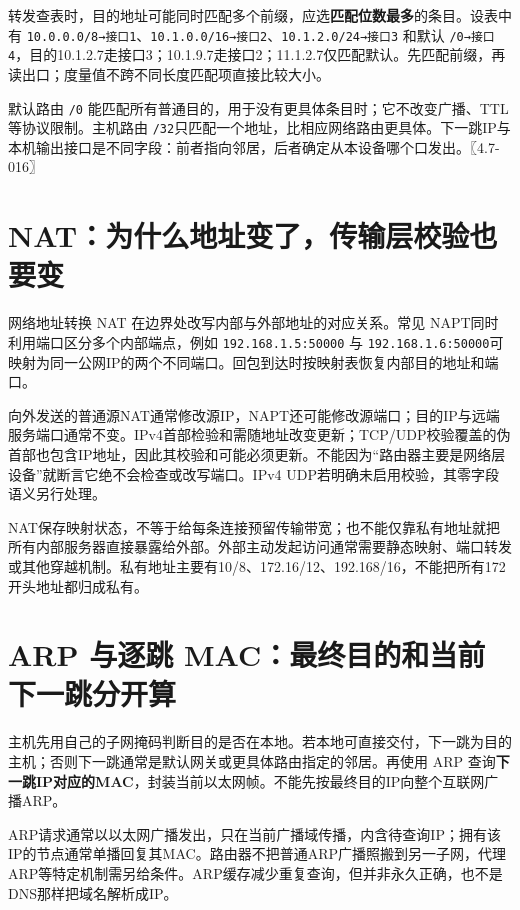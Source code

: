 转发查表时，目的地址可能同时匹配多个前缀，应选\textbf{匹配位数最多}的条目。设表中有 \allowbreak{}\texttt{10.0.0.0/8→接口1}、\allowbreak{}\texttt{10.1.0.0/16→接口2}、\allowbreak{}\texttt{10.1.2.0/24→接口3} 和默认 \allowbreak{}\texttt{/0→接口4}，目的10.1.2.7走接口3；10.1.9.7走接口2；11.1.2.7仅匹配默认。先匹配前缀，再读出口；度量值不跨不同长度匹配项直接比较大小。

默认路由 \allowbreak{}\texttt{/0} 能匹配所有普通目的，用于没有更具体条目时；它不改变广播、TTL等协议限制。主机路由 \allowbreak{}\texttt{/32}只匹配一个地址，比相应网络路由更具体。下一跳IP与本机输出接口是不同字段：前者指向邻居，后者确定从本设备哪个口发出。〖4.7-016〗

\section{NAT：为什么地址变了，传输层校验也要变}\label{cn-04-10}

网络地址转换 NAT 在边界处改写内部与外部地址的对应关系。常见 NAPT同时利用端口区分多个内部端点，例如 \allowbreak{}\texttt{192.168.1.5:50000} 与 \allowbreak{}\texttt{192.168.1.6:50000}可映射为同一公网IP的两个不同端口。回包到达时按映射表恢复内部目的地址和端口。

向外发送的普通源NAT通常修改源IP，NAPT还可能修改源端口；目的IP与远端服务端口通常不变。IPv4首部检验和需随地址改变更新；TCP/UDP校验覆盖的伪首部也包含IP地址，因此其校验和可能必须更新。不能因为``路由器主要是网络层设备''就断言它绝不会检查或改写端口。IPv4 UDP若明确未启用校验，其零字段语义另行处理。

NAT保存映射状态，不等于给每条连接预留传输带宽；也不能仅靠私有地址就把所有内部服务器直接暴露给外部。外部主动发起访问通常需要静态映射、端口转发或其他穿越机制。私有地址主要有10/8、172.16/12、192.168/16，不能把所有172开头地址都归成私有。

\section{ARP 与逐跳 MAC：最终目的和当前下一跳分开算}\label{cn-04-11}

主机先用自己的子网掩码判断目的是否在本地。若本地可直接交付，下一跳为目的主机；否则下一跳通常是默认网关或更具体路由指定的邻居。再使用 ARP 查询\textbf{下一跳IP对应的MAC}，封装当前以太网帧。不能先按最终目的IP向整个互联网广播ARP。

ARP请求通常以以太网广播发出，只在当前广播域传播，内含待查询IP；拥有该IP的节点通常单播回复其MAC。路由器不把普通ARP广播照搬到另一子网，代理ARP等特定机制需另给条件。ARP缓存减少重复查询，但并非永久正确，也不是DNS那样把域名解析成IP。

